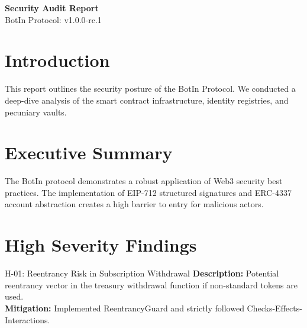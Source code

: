 \documentclass[11pt,a4paper]{article}
\begin{document}
\begin{center}
    \vspace*{1.5cm}
    {\Huge \textbf{\textcolor{deepBlack}{Security Audit Report}}} \\
    \vspace{0.5cm}
    {\Large \textcolor{primaryGold}{BotIn Protocol: v1.0.0-rc.1}} \\
    \vspace{1.5cm}
    \vspace{1.5cm}
\end{center}

\section{Introduction}
This report outlines the security posture of the BotIn Protocol. We conducted a deep-dive analysis of the smart contract infrastructure, identity registries, and pecuniary vaults.

\section{Executive Summary}
The BotIn protocol demonstrates a robust application of Web3 security best practices. The implementation of EIP-712 structured signatures and ERC-4337 account abstraction creates a high barrier to entry for malicious actors.

\section{High Severity Findings}
\begin{premiumbox}{H-01: Reentrancy Risk in Subscription Withdrawal}
    \textbf{Description:} Potential reentrancy vector in the treasury withdrawal function if non-standard tokens are used. \\
    \textbf{Mitigation:} Implemented ReentrancyGuard and strictly followed Checks-Effects-Interactions.
\end{premiumbox}
\end{document}
